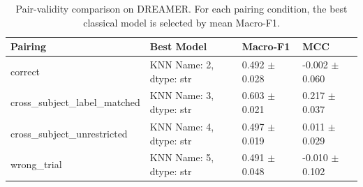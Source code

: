 \begin{table}[!t]
\centering
\caption{Pair-validity comparison on DREAMER. For each pairing condition, the best classical model is selected by mean Macro-F1.}
\label{tab:dreamer_pair_validity_results}
\begin{tabular}{llll}
\toprule
Pairing & Best Model & Macro-F1 & MCC \\
\midrule
correct &     KNN
Name: 2, dtype: str & 0.492 $\pm$ 0.028 & -0.002 $\pm$ 0.060 \\
cross_subject_label_matched &     KNN
Name: 3, dtype: str & 0.603 $\pm$ 0.021 & 0.217 $\pm$ 0.037 \\
cross_subject_unrestricted &     KNN
Name: 4, dtype: str & 0.497 $\pm$ 0.019 & 0.011 $\pm$ 0.029 \\
wrong_trial &     KNN
Name: 5, dtype: str & 0.491 $\pm$ 0.048 & -0.010 $\pm$ 0.102 \\
\bottomrule
\end{tabular}
\end{table}